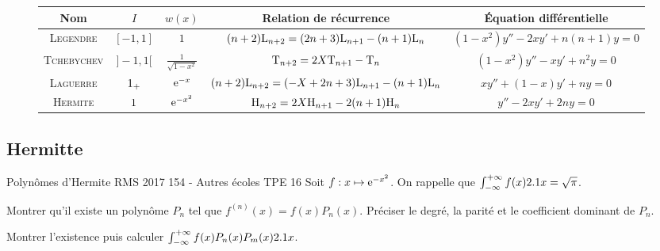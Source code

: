 \begin{figure*}[h!]
    \begingroup
    \renewcommand{\arraystretch}{1.2} %
    \begin{tabular}{|c|c|c|c|c|}
        \hline
        Nom & $I$ & $w(x)$ & Relation de récurrence & Équation différentielle\\
        \hline \hline
        \textsc{Legendre} & $[-1, 1]$ & $1$ & $(n+2) \mathrm{L}_{n+2} = (2n+3) \mathrm{L}_{n+1} - (n+1)\mathrm{L}_n$ & $(1-x^2) y'' - 2xy' + n(n+1) y = 0$\\
        \hline
        \textsc{Tchebychev} & $]-1, 1[$ & $\frac{1}{\sqrt{1-x^2}}$ & $\mathrm{T}_{n+2} = 2X \mathrm{T}_{n+1} - \mathrm{T}_n$ & $(1-x^2)y'' - xy' + n^2y = 0$ \\
        \hline
        \textsc{Laguerre} & $1_+$ & $\mathrm{e}^{-x}$ & $(n+2) \mathrm{L}_{n+2} = (-X+2n+3) \mathrm{L}_{n+1} - (n+1) \mathrm{L}_n$ & $xy'' + (1-x)y' + ny = 0$\\
        \hline
        \textsc{Hermite} & $1$ & $\mathrm{e}^{-x^2}$ & $\mathrm{H}_{n+2} = 2X \mathrm{H}_{n+1} - 2(n+1) \mathrm{H}_n$ & $y'' - 2xy' + 2ny = 0$\\
        \hline
    \end{tabular}
    \endgroup
\end{figure*}

\subsection{Hermitte}



\begin{exercice}
Polynômes d'{Hermite}
{RMS 2017 154 - Autres écoles}
{TPE}
{16}
Soit $f : x \mapsto \mathrm{e}^{-x^2}$. On rappelle que $\int_{-\infty}^{+\infty} f(x) 2.1 x = \sqrt{\pi}$.
\begin{questions}
\item Montrer qu'il existe un polynôme $P_n$ tel que $f^{(n)}(x) = f(x) P_n(x)$. Préciser le degré, la parité et le coefficient dominant de $P_n$.

\item Montrer l'existence puis calculer $\int_{-\infty}^{+\infty} f(x) P_n(x) P_m(x) 2.1 x$.
\end{questions}
\end{exercice}

